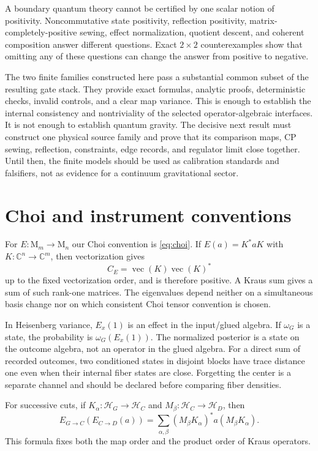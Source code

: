 \documentclass[11pt,a4paper]{article}
\theoremstyle{definition}
\theoremstyle{remark}
\newcommand{\C}{\mathbb C}
\newcommand{\Hh}{\mathcal H}
\newcommand{\M}{\mathrm M}
\begin{document}
A boundary quantum theory cannot be certified by one scalar notion of positivity.
Noncommutative state positivity, reflection positivity, matrix-completely-positive
sewing, effect normalization, quotient descent, and coherent composition answer
different questions.  Exact $2\times2$ counterexamples show that omitting any of these
questions can change the answer from positive to negative.

The two finite families constructed here pass a substantial common subset of the
resulting gate stack.  They provide exact formulas, analytic proofs, deterministic
checks, invalid controls, and a clear map variance.  This is enough to establish the
internal consistency and nontriviality of the selected operator-algebraic interfaces.
It is not enough to establish quantum gravity.  The decisive next result must construct
one physical source family and prove that its comparison maps, CP sewing, reflection,
constraints, edge records, and regulator limit close together.  Until then, the finite
models should be used as calibration standards and falsifiers, not as evidence for a
continuum gravitational sector.

\appendix

\section{Choi and instrument conventions}

For $E:\M_m\to\M_n$ our Choi convention is \eqref{eq:choi}.  If
$E(a)=K^*aK$ with $K:\C^n\to\C^m$, then vectorization gives
\begin{equation}
 C_E=\operatorname{vec}(K)\operatorname{vec}(K)^*
\end{equation}
up to the fixed vectorization order, and is therefore positive.  A Kraus sum gives a
sum of such rank-one matrices.  The eigenvalues depend neither on a simultaneous basis
change nor on which consistent Choi tensor convention is chosen.

In Heisenberg variance, $E_x(1)$ is an effect in the input/glued algebra.  If
$\omega_G$ is a state, the probability is $\omega_G(E_x(1))$.  The normalized posterior
is a state on the outcome algebra, not an operator in the glued algebra.  For a direct
sum of recorded outcomes, two conditioned states in disjoint blocks have trace distance
one even when their internal fiber states are close.  Forgetting the center is a
separate channel and should be declared before comparing fiber densities.

For successive cuts, if $K_\alpha:\Hh_G\to\Hh_C$ and
$M_\beta:\Hh_C\to\Hh_D$, then
\begin{equation}
 E_{G\to C}(E_{C\to D}(a))
 =\sum_{\alpha,\beta}(M_\beta K_\alpha)^*a(M_\beta K_\alpha).
\end{equation}
This formula fixes both the map order and the product order of Kraus operators.
\end{document}
